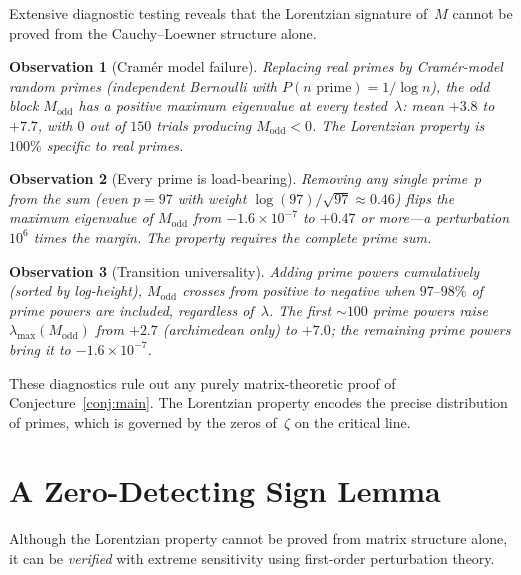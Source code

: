 \documentclass[11pt,a4paper]{article}
\newtheorem{observation}{Observation}[section]
\begin{document}
Extensive diagnostic testing reveals that the Lorentzian signature of~$M$ cannot be proved from the Cauchy--Loewner structure alone.

\begin{observation}[Cram\'er model failure]\label{obs:cramer}
Replacing real primes by Cram\'er-model random primes (independent Bernoulli with $P(n \text{ prime}) = 1/\log n$), the odd block $M_{\mathrm{odd}}$ has a \emph{positive} maximum eigenvalue at every tested~$\lambda$: mean $+3.8$ to $+7.7$, with $0$ out of $150$ trials producing $M_{\mathrm{odd}} < 0$. The Lorentzian property is $100\%$ specific to real primes.
\end{observation}

\begin{observation}[Every prime is load-bearing]\label{obs:load}
Removing any single prime~$p$ from the sum (even $p = 97$ with weight $\log(97)/\sqrt{97} \approx 0.46$) flips the maximum eigenvalue of $M_{\mathrm{odd}}$ from $-1.6 \times 10^{-7}$ to $+0.47$ or more---a perturbation $10^6$ times the margin. The property requires the complete prime sum.
\end{observation}

\begin{observation}[Transition universality]\label{obs:transition}
Adding prime powers cumulatively (sorted by log-height), $M_{\mathrm{odd}}$ crosses from positive to negative when $97\text{--}98\%$ of prime powers are included, regardless of~$\lambda$. The first $\sim 100$ prime powers \emph{raise} $\lambda_{\max}(M_{\mathrm{odd}})$ from $+2.7$ (archimedean only) to $+7.0$; the remaining prime powers bring it to $-1.6 \times 10^{-7}$.
\end{observation}

These diagnostics rule out any purely matrix-theoretic proof of Conjecture~\ref{conj:main}. The Lorentzian property encodes the precise distribution of primes, which is governed by the zeros of~$\zeta$ on the critical line.

\section{A Zero-Detecting Sign Lemma}\label{sec:sign}

Although the Lorentzian property cannot be proved from matrix structure alone, it can be \emph{verified} with extreme sensitivity using first-order perturbation theory.
\end{document}
